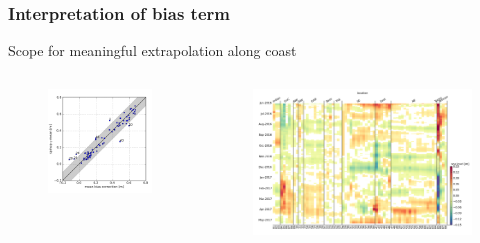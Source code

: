 \begin{frame}
\frametitle{Interpretation of bias term}
Scope for meaningful extrapolation along coast
\begin{columns}
    \begin{column}{0.4\textwidth}
      \begin{figure}      
        \includegraphics[width=\textwidth]{figures/plots/aggSL_bias_breakdown_plot_1.png}
      \end{figure}
    \end{column}

    \begin{column}{0.6\textwidth}
      \begin{figure}      
        \includegraphics[width=\textwidth]{figures/plots/aggSL_bias_breakdown_plot_2.png}
      \end{figure}
    \end{column}
\end{columns}
\end{frame}

